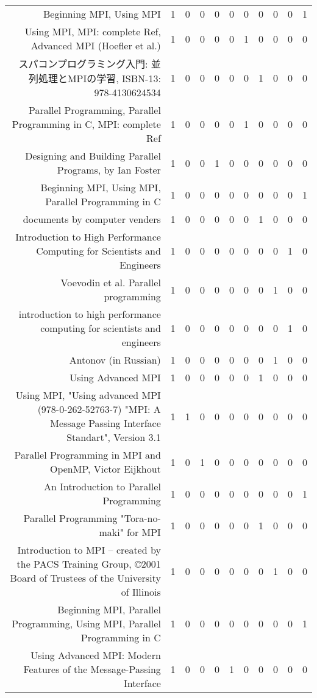 {\begin{landscape}
\begin{longtable}[htb]{r|c|c|c|c|c|c|c|c|c|c}
{Beginning MPI, Using MPI} & 1 & 0 & 0 & 0 & 0 & 0 & 0 & 0 & 0 & 1 \\%
{Using MPI, MPI: complete Ref, Advanced MPI (Hoefler et al.)} & 1 & 0 & 0 & 0 & 0 & 1 & 0 & 0 & 0 & 0 \\%
{スパコンプログラミング入門: 並列処理とMPIの学習, ISBN-13: 978-4130624534} & 1 & 0 & 0 & 0 & 0 & 0 & 1 & 0 & 0 & 0 \\%
{Parallel Programming, Parallel Programming in C, MPI: complete Ref} & 1 & 0 & 0 & 0 & 0 & 1 & 0 & 0 & 0 & 0 \\%
{Designing and Building Parallel Programs, by Ian Foster} & 1 & 0 & 0 & 1 & 0 & 0 & 0 & 0 & 0 & 0 \\%
{Beginning MPI, Using MPI, Parallel Programming in C} & 1 & 0 & 0 & 0 & 0 & 0 & 0 & 0 & 0 & 1 \\%
{documents by computer venders} & 1 & 0 & 0 & 0 & 0 & 0 & 1 & 0 & 0 & 0 \\%
{Introduction to High Performance Computing for Scientists and Engineers} & 1 & 0 & 0 & 0 & 0 & 0 & 0 & 0 & 1 & 0 \\%
{Voevodin et al. Parallel programming} & 1 & 0 & 0 & 0 & 0 & 0 & 0 & 1 & 0 & 0 \\%
{introduction to high performance computing for scientists and engineers} & 1 & 0 & 0 & 0 & 0 & 0 & 0 & 0 & 1 & 0 \\%
{Antonov (in Russian)} & 1 & 0 & 0 & 0 & 0 & 0 & 0 & 1 & 0 & 0 \\%
{Using Advanced MPI} & 1 & 0 & 0 & 0 & 0 & 0 & 1 & 0 & 0 & 0 \\%
{Using MPI, "Using advanced MPI (978-0-262-52763-7)  "MPI: A Message Passing Interface Standart", Version 3.1} & 1 & 1 & 0 & 0 & 0 & 0 & 0 & 0 & 0 & 0 \\%
{Parallel Programming in MPI and OpenMP, Victor Eijkhout} & 1 & 0 & 1 & 0 & 0 & 0 & 0 & 0 & 0 & 0 \\%
{An Introduction to Parallel Programming} & 1 & 0 & 0 & 0 & 0 & 0 & 0 & 0 & 0 & 1 \\%
{Parallel Programming "Tora-no-maki" for MPI} & 1 & 0 & 0 & 0 & 0 & 0 & 1 & 0 & 0 & 0 \\%
{Introduction to MPI – created by the PACS Training Group, ©2001 Board of Trustees of the University of Illinois} & 1 & 0 & 0 & 0 & 0 & 0 & 0 & 1 & 0 & 0 \\%
{Beginning MPI, Parallel Programming, Using MPI, Parallel Programming in C} & 1 & 0 & 0 & 0 & 0 & 0 & 0 & 0 & 0 & 1 \\%
{Using Advanced MPI: Modern Features of the Message-Passing Interface} & 1 & 0 & 0 & 0 & 1 & 0 & 0 & 0 & 0 & 0 \\%

\end{longtable}
\end{landscape}}
